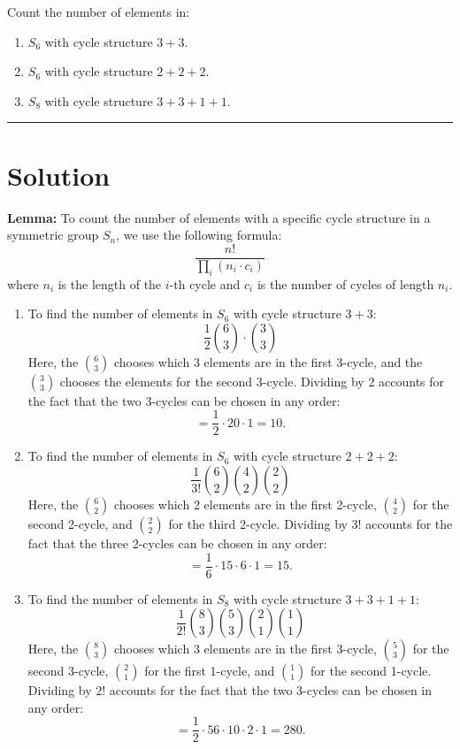 \documentclass[12pt]{amsart}
\theoremstyle{definition}
\numberwithin{equation}{section}
\begin{document}
\begin{exercise}{4} Count the number of elements in:
    \begin{enumerate}[label= \textbf{\alph*.}]
        \item \(S_6\) with cycle structure \(3+3\).
        \item \(S_6\) with cycle structure \(2+2+2\).
        \item \(S_8\) with cycle structure \(3+3+1+1\).
    \end{enumerate} 

    \noindent\rule{\linewidth}{1pt}

    \section*{Solution}
    
    \noindent \textbf{Lemma:} To count the number of elements with a specific cycle structure in a symmetric group \(S_n\), we use the following formula:
    \[
    \frac{n!}{\prod_i (n_i \cdot c_i)}
    \]
    where \(n_i\) is the length of the \(i\)-th cycle and \(c_i\) is the number of cycles of length \(n_i\).

    \begin{enumerate}[label= \textbf{\alph*.}]
        \item To find the number of elements in \(S_6\) with cycle structure \(3+3\):
        \[
        \frac{1}{2} \binom{6}{3} \cdot \binom{3}{3}
        \]
        Here, the \(\binom{6}{3}\) chooses which 3 elements are in the first 3-cycle, and the \(\binom{3}{3}\) chooses the elements for the second 3-cycle. Dividing by 2 accounts for the fact that the two 3-cycles can be chosen in any order:
        \[
        = \frac{1}{2} \cdot 20 \cdot 1 = 10.
        \]

        \item To find the number of elements in \(S_6\) with cycle structure \(2+2+2\):
        \[
        \frac{1}{3!} \binom{6}{2} \binom{4}{2} \binom{2}{2}
        \]
        Here, the \(\binom{6}{2}\) chooses which 2 elements are in the first 2-cycle, \(\binom{4}{2}\) for the second 2-cycle, and \(\binom{2}{2}\) for the third 2-cycle. Dividing by \(3!\) accounts for the fact that the three 2-cycles can be chosen in any order:
        \[
        = \frac{1}{6} \cdot 15 \cdot 6 \cdot 1 = 15.
        \]

        \item To find the number of elements in \(S_8\) with cycle structure \(3+3+1+1\):
        \[
        \frac{1}{2!} \binom{8}{3} \binom{5}{3} \binom{2}{1} \binom{1}{1}
        \]
        Here, the \(\binom{8}{3}\) chooses which 3 elements are in the first 3-cycle, \(\binom{5}{3}\) for the second 3-cycle, \(\binom{2}{1}\) for the first 1-cycle, and \(\binom{1}{1}\) for the second 1-cycle. Dividing by \(2!\) accounts for the fact that the two 3-cycles can be chosen in any order:
        \[
        = \frac{1}{2} \cdot 56 \cdot 10 \cdot 2 \cdot 1 = 280.
        \]
    \end{enumerate}
\end{exercise}
\newpage
\end{document}
